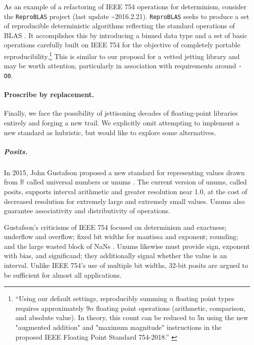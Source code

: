 \documentclass[twoside]{article}
\begin{document}
As an example of a refactoring of IEEE 754 operations for determinism, consider the \texttt{ReproBLAS} project (last update \textasciitilde 2016.2.21).   \texttt{ReproBLAS} seeks to produce a set of reproducible deterministic algorithms reflecting the standard operations of BLAS \citep{ReproBLAS}.  It accomplishes this by introducing a binned data type and a set of basic operations carefully built on IEEE 754 for the objective of completely portable reproducibility.\footnote{“Using our default settings, reproducibly summing $n$ floating point types requires approximately $9n$ floating point operations (arithmetic, comparison, and absolute value). In theory, this count can be reduced to 5n using the new "augmented addition" and "maximum magnitude" instructions in the proposed IEEE Floating Point Standard 754-2018.”  \citep{ReproBLAS}}  This is similar to our proposal for a vetted jetting library and may be worth attention, particularly in association with requirements around \texttt{-O0}.

\paragraph{Proscribe by replacement.}

Finally, we face the possibility of jettisoning decades of floating-point libraries entirely and forging a new trail.  We explicitly omit attempting to implement a new standard as hubristic, but would like to explore some alternatives.

\subparagraph{Posits.}

In 2015, John Gustafson proposed a new standard for representing values drawn from $\mathbb{R}$ called universal numbers or unums \citep{Gustafson2015, Gustafson2017, Gustafson2017a, Posit2022}.  The current version of unums, called posits, supports interval arithmetic and greater resolution near 1.0, at the cost of decreased resolution for extremely large and extremely small values.  Unums also guarantee associativity and distributivity of operations.

Gustafson's criticisms of IEEE 754 focused on determinism and exactness; underflow and overflow; fixed bit widths for mantissa and exponent; rounding; and the large wasted block of NaNs \citep{Risse2016}.  Unums likewise must provide sign, exponent with bias, and significand; they additionally signal whether the value is an interval.  Unlike IEEE 754's use of multiple bit widths, 32-bit posits are argued to be sufficient for almost all applications.
\end{document}
